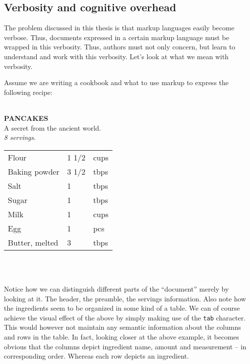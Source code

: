\documentclass{scrreprt}
\newcommand{\tab}{\hspace*{6pt}}
\newenvironment{example}
{ \hrulefill \vspace{12pt} \\ }
{ \\\\ \vspace{12pt} \hrulefill }
\begin{document}
\subsection{Verbosity and cognitive overhead}
The problem discussed in this thesis is that markup languages easily become verbose. Thus, documents expressed in a certain markup language must be wrapped in this verbosity. Thus, authors must not only concern, but learn to understand and work with this verbosity. Let's look at what we mean with verbosity.

Assume we are writing a cookbook and what to use markup to express the following recipe:

\begin{example}
\tab\tab\tab \textbf{PANCAKES}\\
\tab\tab\tab A secret from the ancient world.\\
\tab\tab\tab \emph{8 servings}.\\

\begin{tabular}{l l l}
Flour & 1 1/2 & cups \\
Baking powder & 3 1/2 & tbps \\
Salt & 1 & tbps \\
Sugar & 1 & tbps \\
Milk & 1 & cups \\
Egg & 1 & pcs\\
Butter, melted & 3 & tbps \\
\end{tabular}
\end{example}

Notice how we can distinguish different parts of the ``document'' merely by looking at it. The header, the preamble, the servings information. Also note how the ingredients seem to be organized in some kind of a table. We can of course achieve the visual effect of the above by simply making use of the \texttt{tab} character. This would however not maintain any semantic information about the columns and rows in the table. In fact, looking closer at the above example, it becomes obvious that the columns depict ingredient name, amount and measurement -- in corresponding order. Whereas each row depicts an ingredient. 
\end{document}
